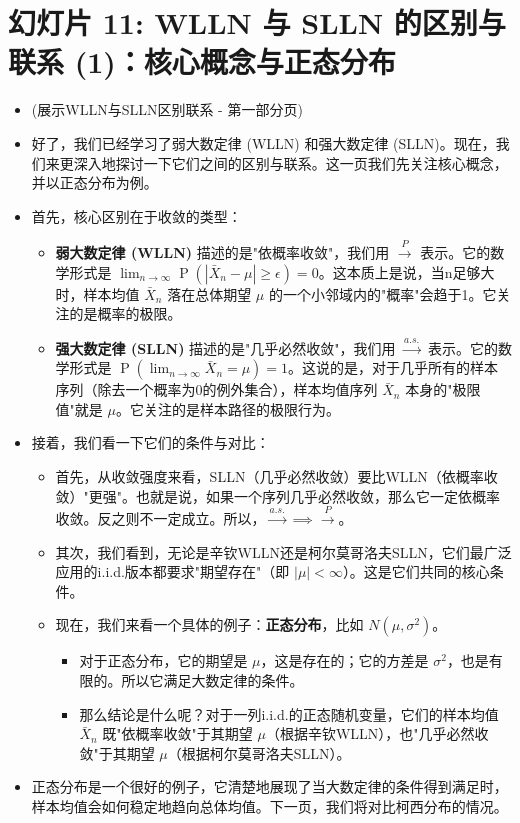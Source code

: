 \documentclass[UTF8]{article} %
\DeclareMathOperator{\Prob}{\operatorname{P}}
\begin{document}
\section*{幻灯片 11: WLLN 与 SLLN 的区别与联系 (1)：核心概念与正态分布}
\begin{itemize}
    \itemsep1em
    \item (展示WLLN与SLLN区别联系 - 第一部分页)
    \item 好了，我们已经学习了弱大数定律 (WLLN) 和强大数定律 (SLLN)。现在，我们来更深入地探讨一下它们之间的区别与联系。这一页我们先关注核心概念，并以正态分布为例。
    \item 首先，核心区别在于收敛的类型：
    \begin{itemize}[label=\textbullet, itemsep=0.3em]
        \item \textbf{弱大数定律 (WLLN)} 描述的是"依概率收敛"，我们用 $\xrightarrow{P}$ 表示。它的数学形式是 $\lim_{n \to \infty} \Prob(|\bar{X}_n - \mu| \geq \epsilon) = 0$。这本质上是说，当n足够大时，样本均值 $\bar{X}_n$ 落在总体期望 $\mu$ 的一个小邻域内的"概率"会趋于1。它关注的是概率的极限。
        \item \textbf{强大数定律 (SLLN)} 描述的是"几乎必然收敛"，我们用 $\xrightarrow{a.s.}$ 表示。它的数学形式是 $\Prob(\lim_{n \to \infty} \bar{X}_n = \mu) = 1$。这说的是，对于几乎所有的样本序列（除去一个概率为0的例外集合），样本均值序列 $\bar{X}_n$ 本身的"极限值"就是 $\mu$。它关注的是样本路径的极限行为。
    \end{itemize}
    \item 接着，我们看一下它们的条件与对比：
    \begin{itemize}[label=\textbullet, itemsep=0.3em]
        \item 首先，从收敛强度来看，SLLN（几乎必然收敛）要比WLLN（依概率收敛）"更强"。也就是说，如果一个序列几乎必然收敛，那么它一定依概率收敛。反之则不一定成立。所以，$\xrightarrow{a.s.} \implies \xrightarrow{P}$。
        \item 其次，我们看到，无论是辛钦WLLN还是柯尔莫哥洛夫SLLN，它们最广泛应用的i.i.d.版本都要求"期望存在"（即 $|\mu| < \infty$）。这是它们共同的核心条件。
        \item 现在，我们来看一个具体的例子：\textbf{正态分布}，比如 $N(\mu, \sigma^2)$。
            \begin{itemize}[label=\textbullet, itemsep=0.2em]
                \item 对于正态分布，它的期望是 $\mu$，这是存在的；它的方差是 $\sigma^2$，也是有限的。所以它满足大数定律的条件。
                \item 那么结论是什么呢？对于一列i.i.d.的正态随机变量，它们的样本均值 $\bar{X}_n$ 既"依概率收敛"于其期望 $\mu$（根据辛钦WLLN），也"几乎必然收敛"于其期望 $\mu$（根据柯尔莫哥洛夫SLLN）。
            \end{itemize}
    \end{itemize}
    \item 正态分布是一个很好的例子，它清楚地展现了当大数定律的条件得到满足时，样本均值会如何稳定地趋向总体均值。下一页，我们将对比柯西分布的情况。
\end{itemize}
\end{document}
